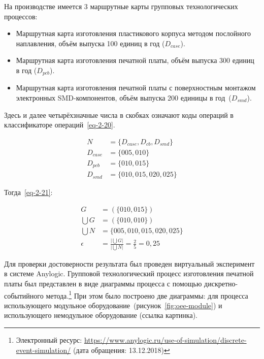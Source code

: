 На производстве имеется 3 маршрутные карты групповых технологических процессов:

\begin{itemize}
	\item Маршрутная карта изготовления пластикового корпуса методом послойного наплавления, объём выпуска 100 единиц в год ($D_{case}$).
	\item Маршрутная карта изготовления печатной платы, объём выпуска 300 единиц в год ($D_{pcb}$).
	\item Маршрутная карта изготовления печатной платы с поверхностным монтажом электронных SMD-компонентов, объём выпуска 200 единицы в год~($D_{smd}$).
\end{itemize}

Здесь и далее четырёхзначные числа в скобках означают коды операций в классификаторе операций~\cref{eq-2-20}.


\begin{equation}
\begin{split}
	N &= \{D_{case}, D_{cb}, D_{smd}\} \\
	D_{case} &= \{005, 010\} \\
	D_{pcb} &= \{010, 015\} \\
	D_{smd} &= \{010, 015, 020, 025\}
\end{split}
\label{eq-2-20}
\end{equation}

\noindent Тогда~\cref{eq-2-21}:

\begin{equation}
\begin{split}
G &= (\{010, 015\}) \\
\bigcup G &= (\{010, 010\}) \\
\bigcup N &= \{005, 010, 015, 020, 025\} \\
\epsilon &= \frac{\big|\bigcup G \big|}{\big|\bigcup N \big|} = \frac{2}{5} = 0,25
\end{split}
\label{eq-2-21}
\end{equation}

Для проверки достоверности результата был проведен виртуальный эксперимент в системе Anylogic. Групповой технологический процесс изготовления печатной платы был представлен в виде диаграммы процесса с помощью дискретно-событийного метода.\footnote{Электронный ресурс: \url{https://www.anylogic.ru/use-of-simulation/discrete-event-simulation/} (дата обращения: 13.12.2018)} При этом было построено две диаграммы: для процесса использующего модульное оборудование~(рисунок~\cref{fig:oee-module}) и использующего немодульное оборудование (ссылка картинка).

